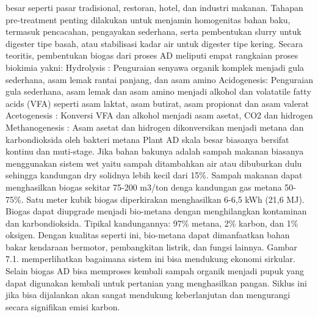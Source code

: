 \documentclass[
  letterpaper,
  DIV=11,
  numbers=noendperiod]{scrreprt}
\begin{document}
besar seperti pasar tradisional, restoran, hotel, dan industri makanan.
Tahapan pre-treatment penting dilakukan untuk menjamin homogenitas bahan
baku, termasuk pencacahan, pengayakan sederhana, serta pembentukan
slurry untuk digester tipe basah, atau stabilisasi kadar air untuk
digester tipe kering. Secara teoritis, pembentukan biogas dari proses AD
meliputi empat rangkaian proses biokimia yakni: Hydrolysis : Penguraian
senyawa organik komplek menjadi gula sederhana, asam lemak rantai
panjang, dan asam amino Acidogenesis: Penguraian gula sederhana, asam
lemak dan asam amino menjadi alkohol dan volatatile fatty acids (VFA)
seperti asam laktat, asam butirat, asam propionat dan asam valerat
Acetogenesis : Konversi VFA dan alkohol menjadi asam asetat, CO2 dan
hidrogen Methanogenesis : Asam asetat dan hidrogen dikonversikan menjadi
metana dan karbondioksida oleh bakteri metana Plant AD skala besar
biasanya bersifat kontinu dan muti-stage. Jika bahan bakunya adalah
sampah makanan biasanya menggunakan sistem wet yaitu sampah ditambahkan
air atau dibuburkan dulu sehingga kandungan dry solidnya lebih kecil
dari 15\%. Sampah makanan dapat menghasilkan biogas sekitar 75-200
m3/ton denga kandungan gas metana 50-75\%. Satu meter kubik biogas
diperkirakan menghasilkan 6-6,5 kWh (21,6 MJ). Biogas dapat diupgrade
menjadi bio-metana dengan menghilangkan kontaminan dan karbondioksida.
Tipikal kandungannya: 97\% metana, 2\% karbon, dan 1\% oksigen. Dengan
kualitas seperti ini, bio-metana dapat dimanfaatkan bahan bakar
kendaraan bermotor, pembangkitan listrik, dan fungsi lainnya. Gambar
7.1. memperlihatkan bagaimana sistem ini bisa mendukung ekonomi
sirkular. Selain biogas AD bisa memproses kembali sampah organik menjadi
pupuk yang dapat digunakan kembali untuk pertanian yang menghasilkan
pangan. Siklus ini jika bisa dijalankan akan sangat mendukung
keberlanjutan dan mengurangi secara signifikan emisi karbon.
\end{document}

